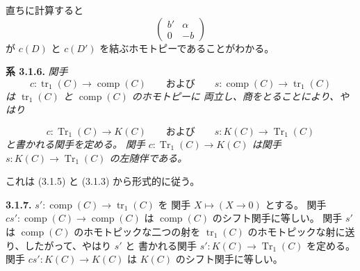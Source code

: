 直ちに計算すると
\begin{equation*}
  \begin{pmatrix}
    b' & \alpha\\
    0  & -b
  \end{pmatrix}
\end{equation*}
が $c(D)$ と $c(D')$ を結ぶホモトピーであることがわかる。

\noindent\textbf{系 3.1.6.}\quad
\emph{関手}
\begin{equation*}
  c\colon\operatorname{tr}_1(C)\longrightarrow\operatorname{comp}(C)
  \qquad\text{および}\qquad
  s\colon\operatorname{comp}(C)\longrightarrow\operatorname{tr}_1(C)
\end{equation*}
\emph{は $\operatorname{tr}_1(C)$ と $\operatorname{comp}(C)$ のホモトピーに
両立し、商をとることにより、やはり}

\begin{equation*}
  c\colon\operatorname{Tr}_1(C)\longrightarrow K(C)
  \qquad\text{および}\qquad
  s\colon K(C)\longrightarrow\operatorname{Tr}_1(C)
\end{equation*}
\emph{と書かれる関手を定める。}
\emph{関手 $c\colon\operatorname{Tr}_1(C)\longrightarrow K(C)$ は関手
$s\colon K(C)\longrightarrow\operatorname{Tr}_1(C)$ の左随伴である。}

これは (3.1.5) と (3.1.3) から形式的に従う。

\noindent\textbf{3.1.7.}\quad
{}
$s'\colon\operatorname{comp}(C)\longrightarrow\operatorname{tr}_1(C)$ を
関手 $X\longmapsto(X\longrightarrow 0)$ とする。
関手 $cs'\colon\operatorname{comp}(C)\longrightarrow\operatorname{comp}(C)$
は $\operatorname{comp}(C)$ のシフト関手に等しい。
関手 $s'$ は $\operatorname{comp}(C)$ のホモトピックな二つの射を
$\operatorname{tr}_1(C)$ のホモトピックな射に送り、したがって、やはり $s'$ と
書かれる関手 $s'\colon K(C)\longrightarrow\operatorname{Tr}_1(C)$ を定める。
関手 $cs'\colon K(C)\longrightarrow K(C)$ は $K(C)$ のシフト関手に等しい。
